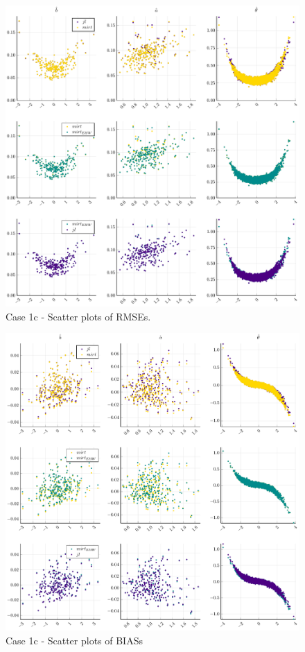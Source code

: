 \begin{figure}[H] 
	\centering
	\includegraphics[width=\textwidth]{Figures/1c/RMSEscatter.pdf}
	\caption{Case 1c - Scatter plots of RMSEs.}
	\label{fig:spRMSE1c}
\end{figure}
\begin{figure}[H] 
	\centering
	\includegraphics[width=\textwidth]{Figures/1c/BIASscatter.pdf}
	\caption{Case 1c - Scatter plots of BIASs }
	\label{fig:spBIAS1c}
\end{figure}
